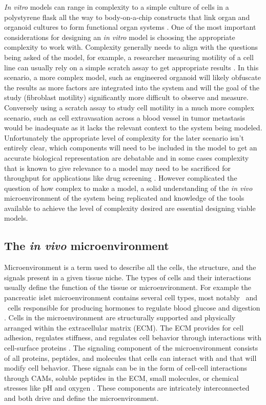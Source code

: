 \textit{In vitro} models can range in complexity to a simple culture of cells in a polystyrene flask all the way to body-on-a-chip constructs that link organ and organoid cultures to form functional organ systems \cite{Esch2011a}. One of the most important considerations for designing an \textit{in vitro} model is choosing the appropriate complexity to work with. Complexity generally needs to align with the questions being asked of the model, for example, a researcher measuring motility of a cell line can usually rely on a simple scratch assay to get appropriate results \cite{liang2007vitro}. In this scenario, a more complex model, such as engineered organoid will likely obfuscate the results as more factors are integrated into the system and will the goal of the study (fibroblast motility) significantly more difficult to observe and measure. Conversely using a scratch assay to study cell motility in a much more complex scenario, such as cell extravasation across a blood vessel in tumor metastasis would be inadequate as it lacks the relevant context to the system being modeled. Unfortunately the appropriate level of complexity for the later scenario isn't entirely clear, which components will need to be included in the model to get an accurate biological representation are debatable \cite{Bouet2015, davies2015capturing, stock2016capturing, Munch2000} and in some cases complexity that is known to give relevance to a model may need to be sacrificed for throughput for applications like drug screening \cite{Hickman2014Three-dimensionalVivo.}. However complicated the question of how complex to make a model, a solid understanding of the \textit{in vivo} microenvironment of the system being replicated and knowledge of the tools available to achieve the level of complexity desired are essential designing viable models. 

\subsection{The \textit{in vivo} microenvironment}
Microenvironment is a term used to describe all the cells, the structure, and the signals present in a given tissue niche. The types of cells and their interactions usually define the function of the tissue or microenvironment. For example the pancreatic islet microenvironment contains several cell types, most notably \textalpha \ and \textbeta \ cells responsible for producing hormones to regulate blood glucose and digestion \cite{Cabrera2006TheFunction.}. Cells in the microenvironment are structurally supported and physically arranged within the extracellular matrix (ECM). The ECM provides for cell adhesion, regulates stiffness, and regulates cell behavior through interactions with cell-surface proteins \cite{Stamenkovic2003, Meredith1993TheFactor.}. The signaling component of the microenvironment consists of all proteins, peptides, and molecules that cells can interact with and that will modify cell behavior. These signals can be in the form of cell-cell interactions through CAMs, soluble peptides in the ECM, small molecules, or chemical stresses like pH and oxygen \cite{Kim2011b}. These components are intricately interconnected and both drive and define the microenvironment.

